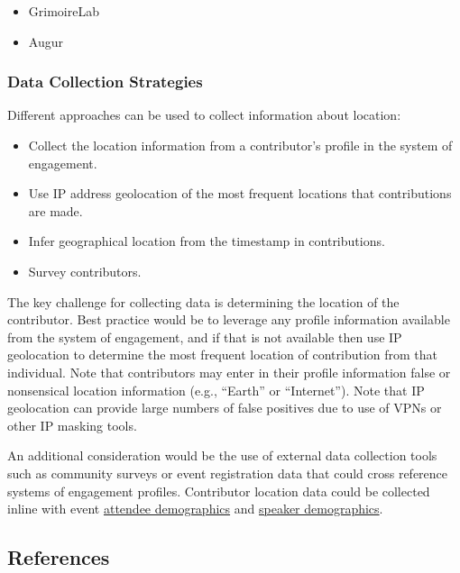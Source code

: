 \documentclass[
  12pt,
]{article}
\providecommand{\tightlist}{%
  \setlength{\itemsep}{0pt}\setlength{\parskip}{0pt}}
\begin{document}
\begin{itemize}
\tightlist
\item
  GrimoireLab
\item
  Augur
\end{itemize}

\hypertarget{data-collection-strategies-4}{%
\subsubsection{Data Collection
Strategies}\label{data-collection-strategies-4}}

Different approaches can be used to collect information about location:

\begin{itemize}
\tightlist
\item
  Collect the location information from a contributor's profile in the
  system of engagement.
\item
  Use IP address geolocation of the most frequent locations that
  contributions are made.
\item
  Infer geographical location from the timestamp in contributions.
\item
  Survey contributors.
\end{itemize}

The key challenge for collecting data is determining the location of the
contributor. Best practice would be to leverage any profile information
available from the system of engagement, and if that is not available
then use IP geolocation to determine the most frequent location of
contribution from that individual. Note that contributors may enter in
their profile information false or nonsensical location information
(e.g., ``Earth'' or ``Internet''). Note that IP geolocation can provide
large numbers of false positives due to use of VPNs or other IP masking
tools.

An additional consideration would be the use of external data collection
tools such as community surveys or event registration data that could
cross reference systems of engagement profiles. Contributor location
data could be collected inline with event
\href{https://chaoss.community/metric-attendee-demographics/}{attendee
demographics} and
\href{https://chaoss.community/metric-speaker-demographics/}{speaker
demographics}.

\hypertarget{references-7}{%
\subsection{References}\label{references-7}}
\end{document}
